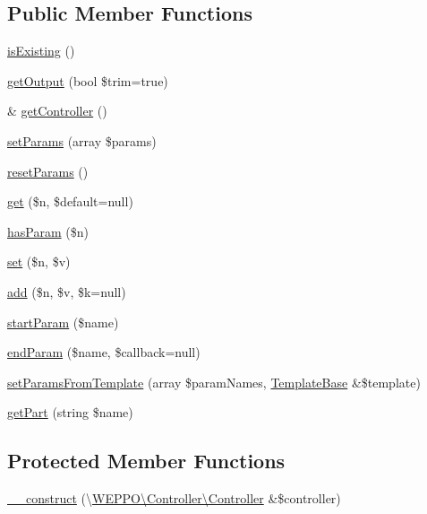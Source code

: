 \subsection*{Public Member Functions}
\begin{DoxyCompactItemize}
\item 
\hyperlink{classWEPPO_1_1Presentation_1_1TemplateBase_a9ff7c3e6cc0610bcaed63e33c376a339}{is\+Existing} ()
\item 
\hyperlink{classWEPPO_1_1Presentation_1_1TemplateBase_a6206bb24a20f4ca995c6368abd9bc55e}{get\+Output} (bool \$trim=true)
\item 
\& \hyperlink{classWEPPO_1_1Presentation_1_1TemplateBase_a23829533363e3ba1c1e554cb42661524}{get\+Controller} ()
\item 
\hyperlink{classWEPPO_1_1Presentation_1_1TemplateBase_ac2f035d3aff03f536714a74276614efc}{set\+Params} (array \$params)
\item 
\hyperlink{classWEPPO_1_1Presentation_1_1TemplateBase_a18f4efb3ba00f613242f330524714826}{reset\+Params} ()
\item 
\hyperlink{classWEPPO_1_1Presentation_1_1TemplateBase_a5be83129d029e94060fe6056e024cae7}{get} (\$n, \$default=null)
\item 
\hyperlink{classWEPPO_1_1Presentation_1_1TemplateBase_a6bd538f09d9386dfdb63116bf714e169}{has\+Param} (\$n)
\item 
\hyperlink{classWEPPO_1_1Presentation_1_1TemplateBase_af4bee053712054122263fb75bd1c47ab}{set} (\$n, \$v)
\item 
\hyperlink{classWEPPO_1_1Presentation_1_1TemplateBase_a44077d6046940c2ff7b7f4be7865b249}{add} (\$n, \$v, \$k=null)
\item 
\hyperlink{classWEPPO_1_1Presentation_1_1TemplateBase_a677f9ea193034a459d2838e1c0d67212}{start\+Param} (\$name)
\item 
\hyperlink{classWEPPO_1_1Presentation_1_1TemplateBase_a1dc9463afcbd64cb066e3ee1d7909b5a}{end\+Param} (\$name, \$callback=null)
\item 
\hyperlink{classWEPPO_1_1Presentation_1_1TemplateBase_afc965dea79037a11a3bee98bbd4966b4}{set\+Params\+From\+Template} (array \$param\+Names, \hyperlink{classWEPPO_1_1Presentation_1_1TemplateBase}{Template\+Base} \&\$template)
\item 
\hyperlink{classWEPPO_1_1Presentation_1_1TemplateBase_aae20cdd328f9e5314a39e6a610e2878a}{get\+Part} (string \$name)
\end{DoxyCompactItemize}
\subsection*{Protected Member Functions}
\begin{DoxyCompactItemize}
\item 
\hyperlink{classWEPPO_1_1Presentation_1_1TemplateBase_a9e6b6cab5b0740ef10b9fafbc5d8d220}{\+\_\+\+\_\+construct} (\textbackslash{}\hyperlink{classWEPPO_1_1Controller_1_1Controller}{W\+E\+P\+P\+O\textbackslash{}\+Controller\textbackslash{}\+Controller} \&\$controller)
\end{DoxyCompactItemize}
